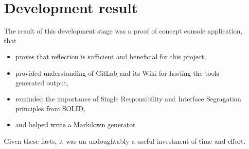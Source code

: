 \section{Development result}

The result of this development stage was a proof of concept console application, that
\begin{itemize}
    \item proves that reflection is sufficient and beneficial for this project,
    \item provided understanding of GitLab and its Wiki for hosting the tools generated output,
    \item reminded the importance of Single Responsibility and Interface Segragation principles from SOLID,
    \item and helped write a Markdown generator
\end{itemize}

Given these facts, it was an undoughtably a useful investment of time and effort.